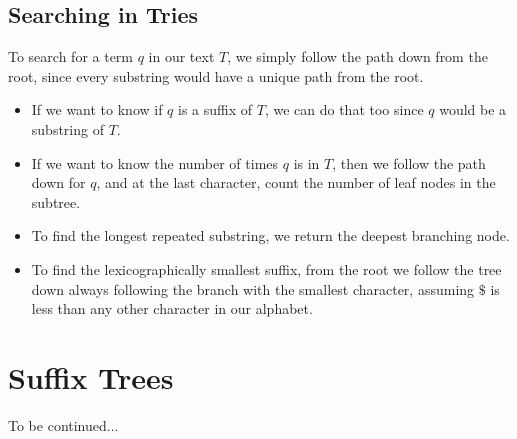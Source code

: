 \documentclass[10pt]{article}
\begin{document}
\subsection*{Searching in Tries}
To search for a term $q$ in our text $T$, we simply follow the path down from the root, since every substring would have a unique path from the root.
\begin{itemize}
	\item If we want to know if $q$ is a suffix of $T$, we can do that too since $q$ would be a substring of $T$.
	\item If we want to know the number of times $q$ is in $T$, then we follow the path down for $q$, and at the last character, count the number of leaf nodes in the subtree.
	\item To find the longest repeated substring, we return the deepest branching node.
	\item To find the lexicographically smallest suffix, from the root we follow the tree down always following the branch with the smallest character, assuming $\mathdollar$ is less than any other character in our alphabet.
\end{itemize}

\section*{Suffix Trees}
To be continued...
\end{document}
